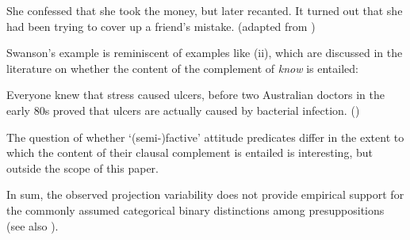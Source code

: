 \documentclass[11pt,fleqn]{article}
\newcommand{\6}{\mbox{$[\hspace*{-.6mm}[$}}
\newcommand{\9}{\mbox{$]\hspace*{-.6mm}]$}}
\begin{document}
{\begin{exe}
 She confessed that she took the money, but later recanted. It turned out that she had been trying to cover up a friend's mistake. \hfill (adapted from \citealt[1540]{swanson2012})
\end{exe}
%
%
Swanson's example is reminiscent of examples like (ii), which are discussed in the literature on whether the content of the complement of {\em know} is entailed:
\begin{exe}
 Everyone knew that stress caused ulcers, before two Australian doctors in the early 80s proved that ulcers are actually caused by bacterial infection. \hfill (\citealt[501]{hazlett2010})
\end{exe}
The question of whether `(semi-)factive' attitude predicates differ in the extent to which the content of their clausal complement is entailed is interesting, but outside the scope of this paper.} In sum, the observed projection variability does not provide empirical support for the commonly assumed categorical binary distinctions among presuppositions (see also \citealt{jayez-etal2015}).
\end{document}
